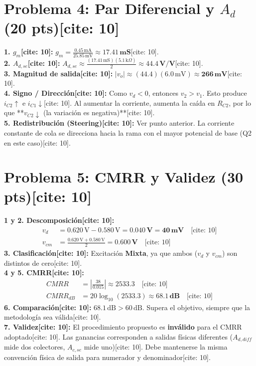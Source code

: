 \documentclass[11pt, a4paper]{article}
\begin{document}
\section*{Problema 4: Par Diferencial y $A_d$ (20 pts)[cite: 10]}
\textbf{1. $g_m$[cite: 10]:} $\displaystyle g_m = \frac{0.45\,\text{mA}}{25.85\,\text{mV}} \approx \mathbf{17.41\,\text{mS}}$[cite: 10]. \\
\textbf{2. $A_{d,se}$[cite: 10]:} $\displaystyle A_{d,se} \approx \frac{(17.41\,\text{mS})(5.1\,\text{k}\Omega)}{2} \approx \mathbf{44.4\,\text{V/V}}$[cite: 10]. \\
\textbf{3. Magnitud de salida[cite: 10]:} $|v_o| \approx (44.4)(6.0\,\text{mV}) \approx \mathbf{266\,\text{mV}}$[cite: 10]. \\
\textbf{4. Signo / Dirección[cite: 10]:} Como $v_d < 0$, entonces $v_2 > v_1$. Esto produce $i_{C2} \uparrow$ e $i_{C1} \downarrow$[cite: 10]. Al aumentar la corriente, aumenta la caída en $R_{C2}$, por lo que **$v_{C2} \downarrow$ (la variación es negativa)**[cite: 10]. \\
\textbf{5. Redistribución (Steering)[cite: 10]:} Ver punto anterior. La corriente constante de cola se direcciona hacia la rama con el mayor potencial de base (Q2 en este caso)[cite: 10].

\section*{Problema 5: CMRR y Validez (30 pts)[cite: 10]}
\textbf{1 y 2. Descomposición[cite: 10]:}
\begin{align*}
    v_d &= 0.620\,\text{V} - 0.580\,\text{V} = \mathbf{0.040\,\text{V}} = \mathbf{40\,\text{mV}} \quad \text{[cite: 10]} \\
    v_{cm} &= \frac{0.620\,\text{V} + 0.580\,\text{V}}{2} = \mathbf{0.600\,\text{V}} \quad \text{[cite: 10]}
\end{align*}
\textbf{3. Clasificación[cite: 10]:} Excitación \textbf{Mixta}, ya que ambos ($v_d$ y $v_{cm}$) son distintos de cero[cite: 10]. \\
\textbf{4 y 5. CMRR[cite: 10]:}
\begin{align*}
    CMRR &= \left| \frac{38}{0.015} \right| \approx \mathbf{2533.3} \quad \text{[cite: 10]} \\
    CMRR_{dB} &= 20 \log_{10}(2533.3) \approx \mathbf{68.1\,\text{dB}} \quad \text{[cite: 10]}
\end{align*}
\textbf{6. Comparación[cite: 10]:} $68.1\,\text{dB} > 60\,\text{dB}$. Supera el objetivo, siempre que la metodología sea válida[cite: 10]. \\
\textbf{7. Validez[cite: 10]:} El procedimiento propuesto es \textbf{inválido} para el CMRR adoptado[cite: 10]. Las ganancias corresponden a salidas físicas diferentes ($A_{d,diff}$ mide dos colectores, $A_{c,se}$ mide uno)[cite: 10]. Debe mantenerse la misma convención física de salida para numerador y denominador[cite: 10].
\end{document}

